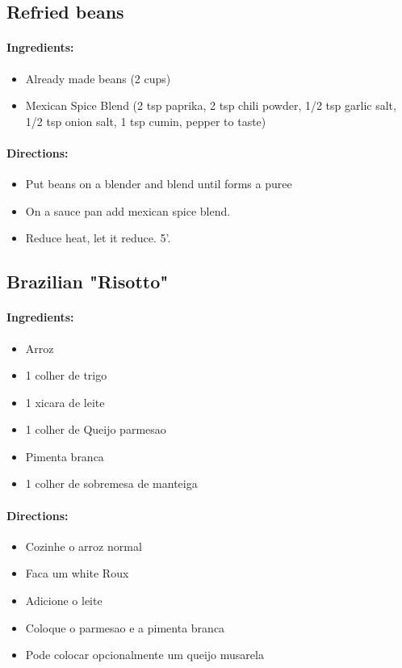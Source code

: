 \documentclass{article}
\begin{document}
\subsection{Refried beans}

\paragraph{Ingredients:}
\begin{itemize}
    \item Already made beans (2 cups)
    \item Mexican Spice Blend (2 tsp paprika, 2 tsp chili powder, 1/2 tsp garlic salt, 1/2 tsp onion salt, 1 tsp cumin, pepper to taste)
\end{itemize}

\paragraph{Directions:}
\begin{itemize}
    \item Put beans on a blender and blend until forms a puree
    \item On a sauce pan add mexican spice blend.
    \item Reduce heat, let it reduce. 5'.
\end{itemize}

\subsection{Brazilian "Risotto"}

\paragraph{Ingredients:}
\begin{itemize}
    \item Arroz
    \item 1 colher de trigo
    \item 1 xicara de leite
    \item 1 colher de Queijo parmesao
    \item Pimenta branca
    \item 1 colher de sobremesa de manteiga
\end{itemize}

\paragraph{Directions:}
\begin{itemize}
    \item Cozinhe o arroz normal
    \item Faca um white Roux
    \item Adicione o leite
    \item Coloque o parmesao e a pimenta branca
    \item Pode colocar opcionalmente um queijo musarela
\end{itemize}
\end{document}
